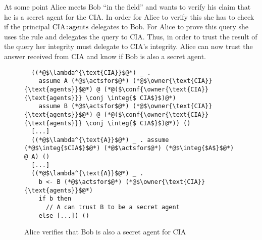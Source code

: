 At some point Alice meets Bob ``in the field'' and wants to verify his claim that he is a secret agent for the CIA. In order for Alice to verify this she has to check if the principal $\text{CIA}\!:\!\text{agents}$ delegates to Bob. For Alice to prove this query she uses the  rule and delegates the query to CIA. Thus, in order to trust the result of the query her integrity must delegate to CIA's integrity.
Alice can now trust the answer received from CIA and know if Bob is also a secret agent.

\begin{figure}
\centering
\begin{lstlisting}
  ((*@$\lambda^{\text{CIA}}$@*) _ .
    assume A (*@$\actsfor$@*) (*@$\owner{\text{CIA}}{\text{agents}}$@*) @ (*@($\conf{\owner{\text{CIA}}{\text{agents}}} \conj \integ{$ CIA$}$)@*)
    assume B (*@$\actsfor$@*) (*@$\owner{\text{CIA}}{\text{agents}}$@*) @ (*@($\conf{\owner{\text{CIA}}{\text{agents}}} \conj \integ{$ CIA$}$)@*)) ()
  [...]
  ((*@$\lambda^{\text{A}}$@*) _ . assume (*@$\integ{$CIA$}$@*) (*@$\actsfor$@*) (*@$\integ{$A$}$@*) @ A) ()
  [...]
  ((*@$\lambda^{\text{A}}$@*) _ .
    b <- B (*@$\actsfor$@*) (*@$\owner{\text{CIA}}{\text{agents}}$@*)
    if b then
      // A can trust B to be a secret agent
    else [...]) ()
\end{lstlisting}
\caption{Alice verifies that Bob is also a secret agent for CIA}
\label{fig:govt-alice-checks-bob}
\end{figure}